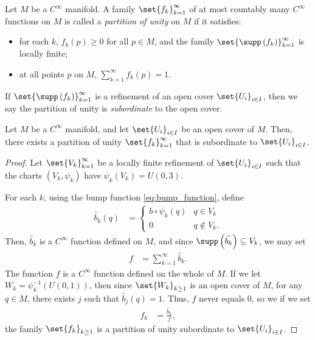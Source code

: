 \documentclass[10pt]{mypackage}
\begin{document}
\begin{definition}
  Let $M$ be a $C^{\infty}$ manifold. A family $\set{f_k}_{k=1}^{\infty}$ of at most countably many $C^{\infty}$ functions on $M$ is called a \textit{partition of unity} on $M$ if it satisfies:
  \begin{itemize}
    \item for each $k$, $f_{k}\left( p \right) \geq 0$ for all $p\in M$, and the family $\set{\supp\left( f_k \right)}_{k=1}^{\infty}$ is locally finite;
    \item at all points $p$ on $M$, $\sum_{k=1}^{\infty}f_k(p) = 1$.
  \end{itemize}
  If $\set{\supp\left( f_k \right)}_{k=1}^{\infty}$ is a refinement of an open cover $\set{U_i}_{i\in I}$, then we say the partition of unity is \textit{subordinate} to the open cover.
\end{definition}
\begin{theorem}
  Let $M$ be a $C^{\infty}$ manifold, and let $\set{U_{i}}_{i\in I}$ be an open cover of $M$. Then, there exists a partition of unity $\set{f_k}_{k=1}^{\infty}$ that is subordinate to $\set{U_{i}}_{i\in I}$.
\end{theorem}
\begin{proof}
  Let $\set{V_k}_{k=1}^{\infty}$ be a locally finite refinement of $\set{U_i}_{i\in I}$ such that the charts $\left( V_k,\psi_k \right)$ have $\psi_k\left( V_k \right) = U\left( 0,3 \right)$.\newline

  For each $k$, using the bump function \eqref{eq:bump_function}, define
  \begin{align*}
    \widetilde{b_k}\left( q \right) &= \begin{cases}
      b\circ \psi_k\left( q \right) & q\in V_k\\
      0 & q\notin V_k.
    \end{cases}
  \end{align*}
  Then, $ \widetilde{b_k} $ is a $C^{\infty}$ function defined on $M$, and since $ \supp\left( \widetilde{b_k} \right)\subseteq V_k $, we may set
  \begin{align*}
    f &= \sum_{k=1}^{\infty} \widetilde{b_k}.
  \end{align*}
  The function $f$ is a $C^{\infty}$ function defined on the whole of $M$. If we let $W_k = \psi_k^{-1}\left( U\left( 0,1 \right) \right)$, then since $\set{W_k}_{k\geq 1}$ is an open cover of $M$, for any $q\in M$, there exists $j$ such that $ \widetilde{b_j}\left( q \right) = 1 $. Thus, $f$ never equals $0$, so we if we set
  \begin{align*}
    f_k &= \frac{\widetilde{b_k}}{f},
  \end{align*}
  the family $\set{f_k}_{k\geq 1}$ is a partition of unity subordinate to $\set{U_i}_{i\in I}$.
\end{proof}
\end{document}
